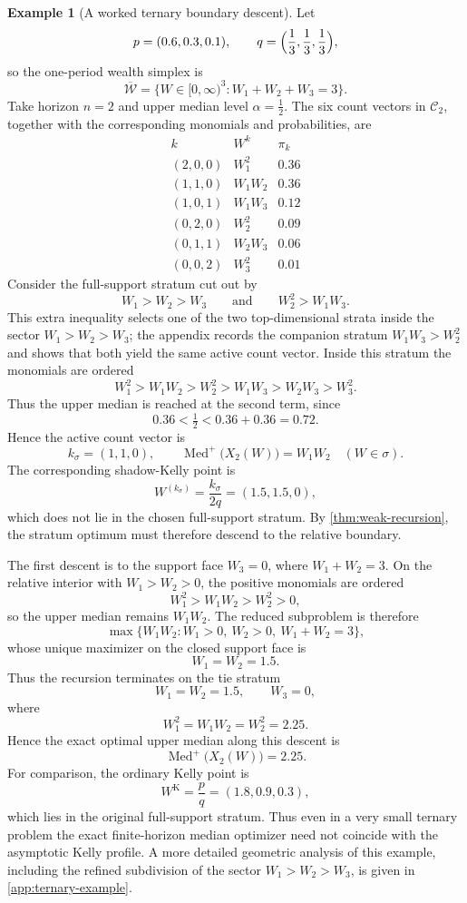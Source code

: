\documentclass[11pt]{article}
\theoremstyle{definition}
\newtheorem{example}[example]{Example}
\newcommand{\1}{\mathbf{1}}
\newcommand{\Med}{\operatorname{Med}}
\begin{document}
\begin{example}[A worked ternary boundary descent]\label{ex:ternary-main}
Let
\[
p=(0.6,0.3,0.1),
\qquad
q=\Bigl(\frac13,\frac13,\frac13\Bigr),
\]
so the one-period wealth simplex is
\[
\overline{\mathcal W}=\{W\in[0,\infty)^3: W_1+W_2+W_3=3\}.
\]
Take horizon $n=2$ and upper median level $\alpha=\tfrac12$. The six count vectors in $\mathcal C_2$, together with the corresponding monomials and probabilities, are
\[
\begin{array}{c|c|c}
k & W^k & \pi_k \\ \hline
(2,0,0) & W_1^2 & 0.36 \\
(1,1,0) & W_1W_2 & 0.36 \\
(1,0,1) & W_1W_3 & 0.12 \\
(0,2,0) & W_2^2 & 0.09 \\
(0,1,1) & W_2W_3 & 0.06 \\
(0,0,2) & W_3^2 & 0.01
\end{array}
\]
Consider the full-support stratum cut out by
\[
W_1>W_2>W_3
\qquad\text{and}\qquad
W_2^2>W_1W_3.
\]
This extra inequality selects one of the two top-dimensional strata inside the sector $W_1>W_2>W_3$; the appendix records the companion stratum $W_1W_3>W_2^2$ and shows that both yield the same active count vector. Inside this stratum the monomials are ordered
\[
W_1^2>W_1W_2>W_2^2>W_1W_3>W_2W_3>W_3^2.
\]
Thus the upper median is reached at the second term, since
\[
0.36<\tfrac12<0.36+0.36=0.72.
\]
Hence the active count vector is
\[
k_\sigma=(1,1,0),
\qquad
\Med^+\bigl(X_2(W)\bigr)=W_1W_2
\quad (W\in\sigma).
\]
The corresponding shadow-Kelly point is
\[
W^{(k_\sigma)}=\frac{k_\sigma}{2q}=(1.5,1.5,0),
\]
which does not lie in the chosen full-support stratum. By \cref{thm:weak-recursion}, the stratum optimum must therefore descend to the relative boundary.

The first descent is to the support face $W_3=0$, where $W_1+W_2=3$. On the relative interior with $W_1>W_2>0$, the positive monomials are ordered
\[
W_1^2>W_1W_2>W_2^2>0,
\]
so the upper median remains $W_1W_2$. The reduced subproblem is therefore
\[
\max\{W_1W_2: W_1>0,\ W_2>0,\ W_1+W_2=3\},
\]
whose unique maximizer on the closed support face is
\[
W_1=W_2=1.5.
\]
Thus the recursion terminates on the tie stratum
\[
W_1=W_2=1.5,
\qquad
W_3=0,
\]
where
\[
W_1^2=W_1W_2=W_2^2=2.25.
\]
Hence the exact optimal upper median along this descent is
\[
\Med^+\bigl(X_2(W)\bigr)=2.25.
\]
For comparison, the ordinary Kelly point is
\[
W^{\mathrm K}=\frac{p}{q}=(1.8,0.9,0.3),
\]
which lies in the original full-support stratum. Thus even in a very small ternary problem the exact finite-horizon median optimizer need not coincide with the asymptotic Kelly profile. A more detailed geometric analysis of this example, including the refined subdivision of the sector $W_1>W_2>W_3$, is given in \cref{app:ternary-example}.
\end{example}
\end{document}
